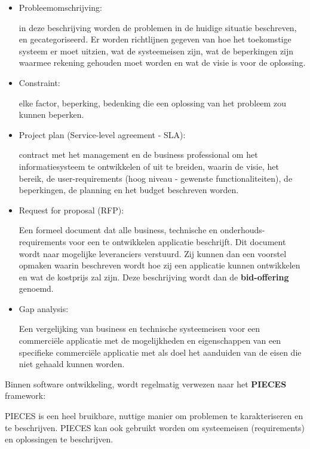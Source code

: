 \begin{itemize}
    \item Probleemomschrijving:
    
in deze beschrijving worden de problemen in de huidige situatie beschreven, en gecategoriseerd. Er worden richtlijnen gegeven van hoe het toekomstige systeem er moet uitzien, wat de systeemeisen zijn, wat de beperkingen zijn waarmee rekening gehouden moet worden en wat de visie is voor de oplossing.
    \item Constraint:
    
elke factor, beperking, bedenking die een oplossing van het probleem zou kunnen beperken.
    \item Project plan (Service-level agreement - SLA):
    
contract met het management en de business professional om het informatiesysteem te ontwikkelen of uit te breiden, waarin de visie, het bereik, de user-requirements (hoog niveau - gewenste functionaliteiten), de beperkingen, de planning en het budget beschreven worden.
\item Request for proposal (RFP):

Een formeel document dat alle business, technische en onderhouds- requirements voor een te ontwikkelen applicatie beschrijft. Dit document wordt naar mogelijke leveranciers verstuurd. Zij kunnen dan een voorstel opmaken waarin beschreven wordt hoe zij een applicatie kunnen ontwikkelen en wat de kostprijs zal zijn. Deze beschrijving wordt dan de \textbf{bid-offering} genoemd.
\item Gap analysis:

Een vergelijking van business en technische systeemeisen voor een commerciële applicatie met de mogelijkheden en eigenschappen van een specifieke commerciële applicatie met als doel het aanduiden van de eisen die niet gehaald kunnen worden.
\end{itemize}
\newpage
Binnen software ontwikkeling, wordt regelmatig verwezen naar het \textbf{PIECES} framework:

\begin{center}
\noindent{}
\end{center}

PIECES is een heel bruikbare, nuttige manier om problemen te karakteriseren en te beschrijven. PIECES kan ook gebruikt worden om systeemeisen (requirements) en oplossingen te beschrijven.
